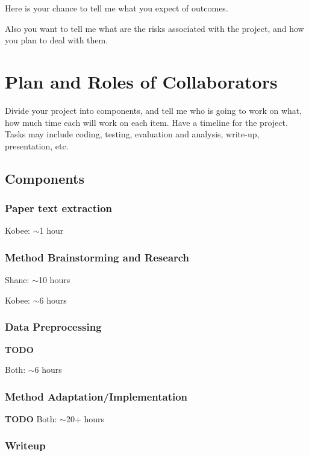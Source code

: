 \documentclass[conference]{sig-alternate-05-2015}
\begin{document}
Here is your chance to tell me what you expect of outcomes. 

Also you want to tell me what are the risks associated with the project, and how you plan to deal with them. 

\section{Plan and Roles of Collaborators}

Divide your project into components, and tell me who is going to work on what, how much time each will work on each item. Have a timeline for the project. Tasks may include coding, testing, evaluation and analysis, write-up, presentation, etc. 

\subsection{Components}

\subsubsection{Paper text extraction}

Kobee: $\sim$1 hour

\subsubsection{Method Brainstorming and Research}

Shane: $\sim$10 hours

Kobee: $\sim$6 hours

\subsubsection{Data Preprocessing}

\textbf{TODO}

Both: $\sim$6 hours

\subsubsection{Method Adaptation/Implementation}

\textbf{TODO}
Both: $\sim$20+ hours

\subsubsection{Writeup}
\end{document}
